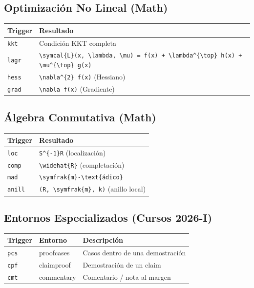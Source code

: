\documentclass[11pt]{article}
\begin{document}
\subsection{Optimización No Lineal (Math)}
\label{sec:org0677b68}
\begin{center}
\begin{tabular}{ll}
Trigger & Resultado\\
\hline
\texttt{kkt} & Condición KKT completa\\
\texttt{lagr} & \texttt{\textbackslash{}symcal\{L\}(x, \textbackslash{}lambda, \textbackslash{}mu) = f(x) + \textbackslash{}lambda\textasciicircum{}\{\textbackslash{}top\} h(x) + \textbackslash{}mu\textasciicircum{}\{\textbackslash{}top\} g(x)}\\
\texttt{hess} & \texttt{\textbackslash{}nabla\textasciicircum{}\{2\} f(x)} (Hessiano)\\
\texttt{grad} & \texttt{\textbackslash{}nabla f(x)} (Gradiente)\\
\end{tabular}
\end{center}
\subsection{Álgebra Conmutativa (Math)}
\label{sec:orgd8449af}
\begin{center}
\begin{tabular}{ll}
Trigger & Resultado\\
\hline
\texttt{loc} & \texttt{S\textasciicircum{}\{-1\}R} (localización)\\
\texttt{comp} & \texttt{\textbackslash{}widehat\{R\}} (completación)\\
\texttt{mad} & \texttt{\textbackslash{}symfrak\{m\}-\textbackslash{}text\{ádico\}}\\
\texttt{anill} & \texttt{(R, \textbackslash{}symfrak\{m\}, k)} (anillo local)\\
\end{tabular}
\end{center}
\subsection{Entornos Especializados (Cursos 2026-I)}
\label{sec:orge945ed2}
\begin{center}
\begin{tabular}{lll}
Trigger & Entorno & Descripción\\
\hline
\texttt{pcs} & proofcases & Casos dentro de una demostración\\
\texttt{cpf} & claimproof & Demostración de un claim\\
\texttt{cmt} & commentary & Comentario / nota al margen\\
\end{tabular}
\end{center}
\end{document}
